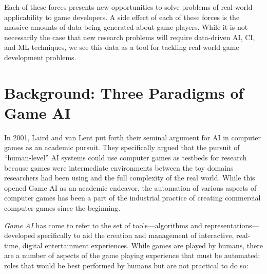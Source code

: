 \documentclass[conference]{IEEEtran}
\begin{document}


Each of these forces presents new opportunities to solve problems of real-world applicability to game developers.
A side effect of each of these forces is the massive amounts of data being generated about game players.
While it is not necessarily the case that new research problems will require data-driven AI, CI, and ML techniques, we see this data as a tool for tackling real-world game development problems.



\section{Background: Three Paradigms of Game AI}

In 2001, Laird and van Lent \cite{laird2001:gameai} put forth their seminal argument for AI in computer games as an academic pursuit. 
They specifically argued that the pursuit of ``human-level'' AI systems could use computer games as testbeds for research because games were intermediate environments between the toy domains researchers had been using and the full complexity of the real world.
While this opened Game AI as an academic endeavor, the automation of various aspects of computer games has been a part of the industrial practice of creating commercial computer games since the beginning. 

{\em Game AI} has come to refer to the set of tools---algorithms and representations---developed specifically to aid the creation and management of interactive, real-time, digital entertainment experiences.
While games are played by humans, there are a number of aspects of the game playing experience that must be automated: roles that would be best performed by humans but are not practical to do so:
\end{document}
